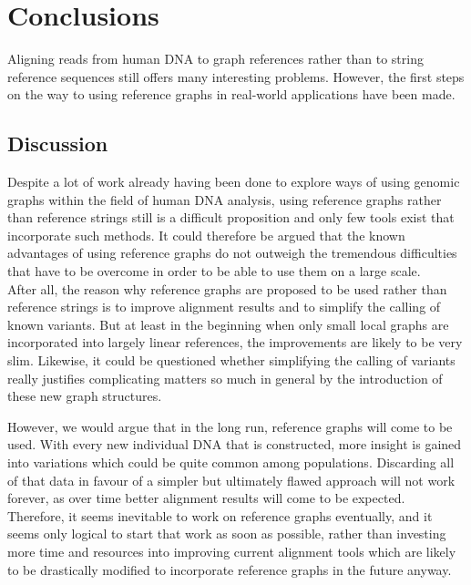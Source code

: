 \documentclass[a4paper,12pt,twoside,BCOR=10mm]{scrbook}
\begin{document}

\chapter{Conclusions}
%

Aligning reads from human DNA to graph references rather than to string reference sequences 
still offers many interesting problems. 
However, the first steps on the way to using reference graphs in real-world applications have been made.

\section{Discussion}

Despite a lot of work already having been done to explore 
ways of using genomic graphs within the field of human DNA analysis, 
using reference graphs rather than reference strings still 
is a difficult proposition and only few tools exist that incorporate 
such methods. 
It could therefore be argued that the known advantages of using reference 
graphs do not outweigh the tremendous difficulties that have to 
be overcome in order to be able to use them on a large scale. \\
After all, the reason why reference graphs are proposed to be used 
rather than reference strings is to improve alignment results 
and to simplify the calling of known variants. 
But at least in the beginning when only small local graphs are incorporated 
into largely linear references, the improvements are likely to be very slim. 
Likewise, it could be questioned whether simplifying the calling of variants really 
justifies complicating matters so much in general by the introduction of 
these new graph structures.

However, we would argue that in the long run, reference graphs will come to be used. 
With every new individual DNA that is constructed, more insight is gained into 
variations which could be quite common among populations. 
Discarding all of that data in favour of a simpler but ultimately flawed approach 
will not work forever, as over time better alignment results will come to be expected. \\
Therefore, it seems inevitable to work on reference graphs eventually, 
and it seems only logical to start that work as soon as possible, rather than investing 
more time and resources into improving current alignment tools which are likely to be drastically 
modified to incorporate reference graphs in the future anyway.
\end{document}
